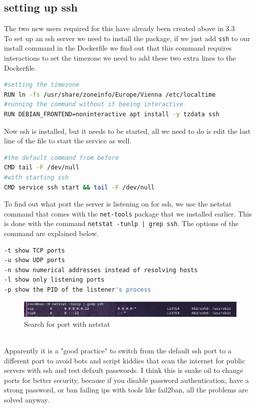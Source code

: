 \documentclass[a4paper]{article}
\begin{document}
\subsection {setting up ssh}
The two new users required for this have already been created above in 3.3 \\
To set up an ssh server we need to install the package, if we just add \texttt{ssh} to our install command in the Dockerfile we find out that this command requires interactions to set the timezone we need to add these two extra lines to the Dockerfile.
\begin{lstlisting}[language=bash]
#setting the timezone
RUN ln -fs /usr/share/zoneinfo/Europe/Vienna /etc/localtime
#running the command without it beeing interactive
RUN DEBIAN_FRONTEND=noninteractive apt install -y tzdata ssh
\end{lstlisting}
Now ssh is installed, but it needs to be started, all we need to do is edit the last line of the file to start the service as well.
\begin{lstlisting}[language=bash]
#the default command from before
CMD tail -F /dev/null
#with starting ssh
CMD service ssh start && tail -F /dev/null
\end{lstlisting}
To find out what port the server is listening on for ssh, we use the netstat command that comes with the \texttt{net-tools} package that we installed earlier.
This is done with the command \texttt{netstat -tunlp | grep ssh}. The options of the command are explained below.
\begin{lstlisting}[language=bash]
-t show TCP ports
-u show UDP ports
-n show numerical addresses instead of resolving hosts
-l show only listening ports
-p show the PID of the listener's process
\end{lstlisting}\cite{netstat}
\begin{figure}[h]
	\centering
	\includegraphics[scale=0.4]{images/netstatssh.png}
	\caption{Search for port with netstat}
\end{figure} \\
Apparently it is a "good practice" to switch from the default ssh port to a different port to avoid bots and script kiddies that scan the internet for public servers with ssh and test default passwords. I think this is snake oil to change ports for better security, because if you disable password authentication, have a strong password, or ban failing ips with tools like fail2ban, all the problems are solved anyway.\cite{hardening-linux-video} \\
\end{document}
